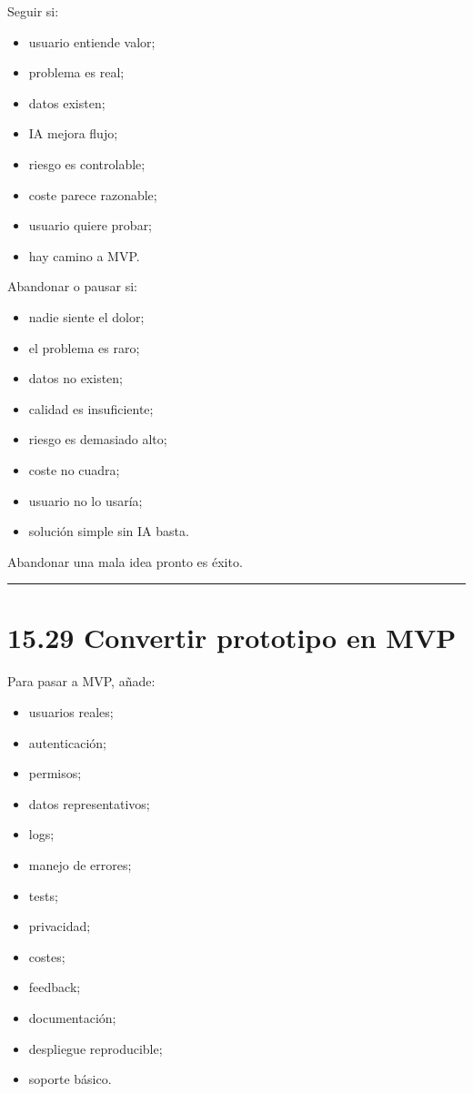 Seguir si:

\begin{itemize}
\tightlist
\item
  usuario entiende valor;
\item
  problema es real;
\item
  datos existen;
\item
  IA mejora flujo;
\item
  riesgo es controlable;
\item
  coste parece razonable;
\item
  usuario quiere probar;
\item
  hay camino a MVP.
\end{itemize}

Abandonar o pausar si:

\begin{itemize}
\tightlist
\item
  nadie siente el dolor;
\item
  el problema es raro;
\item
  datos no existen;
\item
  calidad es insuficiente;
\item
  riesgo es demasiado alto;
\item
  coste no cuadra;
\item
  usuario no lo usaría;
\item
  solución simple sin IA basta.
\end{itemize}

Abandonar una mala idea pronto es éxito.

\begin{center}\rule{0.5\linewidth}{0.5pt}\end{center}

\section{15.29 Convertir prototipo en
MVP}\label{convertir-prototipo-en-mvp}

Para pasar a MVP, añade:

\begin{itemize}
\tightlist
\item
  usuarios reales;
\item
  autenticación;
\item
  permisos;
\item
  datos representativos;
\item
  logs;
\item
  manejo de errores;
\item
  tests;
\item
  privacidad;
\item
  costes;
\item
  feedback;
\item
  documentación;
\item
  despliegue reproducible;
\item
  soporte básico.
\end{itemize}


